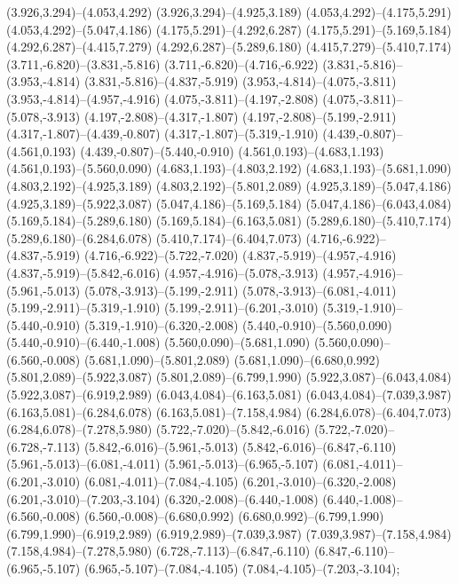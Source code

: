 \begin{scope}
(3.926,3.294)--(4.053,4.292) (3.926,3.294)--(4.925,3.189) (4.053,4.292)--(4.175,5.291) (4.053,4.292)--(5.047,4.186) (4.175,5.291)--(4.292,6.287) (4.175,5.291)--(5.169,5.184) (4.292,6.287)--(4.415,7.279) (4.292,6.287)--(5.289,6.180) (4.415,7.279)--(5.410,7.174) (3.711,-6.820)--(3.831,-5.816) (3.711,-6.820)--(4.716,-6.922) (3.831,-5.816)--(3.953,-4.814) (3.831,-5.816)--(4.837,-5.919) (3.953,-4.814)--(4.075,-3.811) (3.953,-4.814)--(4.957,-4.916) (4.075,-3.811)--(4.197,-2.808) (4.075,-3.811)--(5.078,-3.913) (4.197,-2.808)--(4.317,-1.807) (4.197,-2.808)--(5.199,-2.911) (4.317,-1.807)--(4.439,-0.807) (4.317,-1.807)--(5.319,-1.910) (4.439,-0.807)--(4.561,0.193) (4.439,-0.807)--(5.440,-0.910) (4.561,0.193)--(4.683,1.193) (4.561,0.193)--(5.560,0.090) (4.683,1.193)--(4.803,2.192) (4.683,1.193)--(5.681,1.090) (4.803,2.192)--(4.925,3.189) (4.803,2.192)--(5.801,2.089) (4.925,3.189)--(5.047,4.186) (4.925,3.189)--(5.922,3.087) (5.047,4.186)--(5.169,5.184) (5.047,4.186)--(6.043,4.084) (5.169,5.184)--(5.289,6.180) (5.169,5.184)--(6.163,5.081) (5.289,6.180)--(5.410,7.174) (5.289,6.180)--(6.284,6.078) (5.410,7.174)--(6.404,7.073) (4.716,-6.922)--(4.837,-5.919) (4.716,-6.922)--(5.722,-7.020) (4.837,-5.919)--(4.957,-4.916) (4.837,-5.919)--(5.842,-6.016) (4.957,-4.916)--(5.078,-3.913) (4.957,-4.916)--(5.961,-5.013) (5.078,-3.913)--(5.199,-2.911) (5.078,-3.913)--(6.081,-4.011) (5.199,-2.911)--(5.319,-1.910) (5.199,-2.911)--(6.201,-3.010) (5.319,-1.910)--(5.440,-0.910) (5.319,-1.910)--(6.320,-2.008) (5.440,-0.910)--(5.560,0.090) (5.440,-0.910)--(6.440,-1.008) (5.560,0.090)--(5.681,1.090) (5.560,0.090)--(6.560,-0.008) (5.681,1.090)--(5.801,2.089) (5.681,1.090)--(6.680,0.992) (5.801,2.089)--(5.922,3.087) (5.801,2.089)--(6.799,1.990) (5.922,3.087)--(6.043,4.084) (5.922,3.087)--(6.919,2.989) (6.043,4.084)--(6.163,5.081) (6.043,4.084)--(7.039,3.987) (6.163,5.081)--(6.284,6.078) (6.163,5.081)--(7.158,4.984) (6.284,6.078)--(6.404,7.073) (6.284,6.078)--(7.278,5.980) (5.722,-7.020)--(5.842,-6.016) (5.722,-7.020)--(6.728,-7.113) (5.842,-6.016)--(5.961,-5.013) (5.842,-6.016)--(6.847,-6.110) (5.961,-5.013)--(6.081,-4.011) (5.961,-5.013)--(6.965,-5.107) (6.081,-4.011)--(6.201,-3.010) (6.081,-4.011)--(7.084,-4.105) (6.201,-3.010)--(6.320,-2.008) (6.201,-3.010)--(7.203,-3.104) (6.320,-2.008)--(6.440,-1.008) (6.440,-1.008)--(6.560,-0.008) (6.560,-0.008)--(6.680,0.992) (6.680,0.992)--(6.799,1.990) (6.799,1.990)--(6.919,2.989) (6.919,2.989)--(7.039,3.987) (7.039,3.987)--(7.158,4.984) (7.158,4.984)--(7.278,5.980) (6.728,-7.113)--(6.847,-6.110) (6.847,-6.110)--(6.965,-5.107) (6.965,-5.107)--(7.084,-4.105) (7.084,-4.105)--(7.203,-3.104);

\end{scope}
